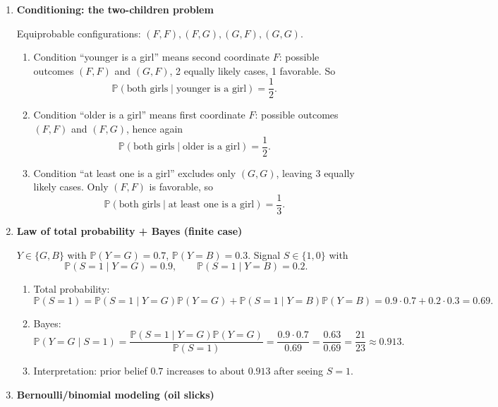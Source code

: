 \documentclass[11pt]{article}
\begin{document}
\begin{enumerate}
\bigskip

\item \textbf{Conditioning: the two-children problem}

Equiprobable configurations:
$(F,F),(F,G),(G,F),(G,G)$.

\begin{enumerate}[label=(\alph*)]
\item Condition ``younger is a girl'' means second coordinate $F$:
possible outcomes $(F,F)$ and $(G,F)$, 2 equally likely cases, 1 favorable.
So
\[
\mathbb{P}(\text{both girls}\mid \text{younger is a girl})=\frac{1}{2}.
\]

\item Condition ``older is a girl'' means first coordinate $F$:
possible outcomes $(F,F)$ and $(F,G)$, hence again
\[
\mathbb{P}(\text{both girls}\mid \text{older is a girl})=\frac{1}{2}.
\]

\item Condition ``at least one is a girl'' excludes only $(G,G)$, leaving 3 equally likely cases.
Only $(F,F)$ is favorable, so
\[
\mathbb{P}(\text{both girls}\mid \text{at least one is a girl})=\frac{1}{3}.
\]
\end{enumerate}

\bigskip

\item \textbf{Law of total probability + Bayes (finite case)}

$Y\in\{G,B\}$ with $\mathbb{P}(Y=G)=0.7$, $\mathbb{P}(Y=B)=0.3$.
Signal $S\in\{1,0\}$ with
\[
\mathbb{P}(S=1\mid Y=G)=0.9,
\qquad
\mathbb{P}(S=1\mid Y=B)=0.2.
\]

\begin{enumerate}[label=(\alph*)]
\item Total probability:
\[
\mathbb{P}(S=1)=\mathbb{P}(S=1\mid Y=G)\mathbb{P}(Y=G)+\mathbb{P}(S=1\mid Y=B)\mathbb{P}(Y=B)
=0.9\cdot0.7+0.2\cdot0.3=0.69.
\]

\item Bayes:
\[
\mathbb{P}(Y=G\mid S=1)=\frac{\mathbb{P}(S=1\mid Y=G)\mathbb{P}(Y=G)}{\mathbb{P}(S=1)}
=
\frac{0.9\cdot0.7}{0.69}
=
\frac{0.63}{0.69}
=
\frac{21}{23}\approx 0.913.
\]

\item Interpretation: prior belief $0.7$ increases to about $0.913$ after seeing $S=1$.
\end{enumerate}

\bigskip

\item \textbf{Bernoulli/binomial modeling (oil slicks)}


\end{enumerate}
\end{document}
